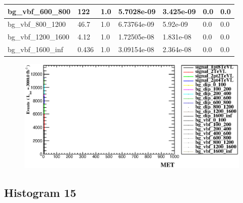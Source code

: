 \documentclass[a4paper, 10pt]{article}
\begin{document}
\begin{table}[H]
\begin{center}
\begin{tabular}{|m{23.0mm}|m{23.0mm}|m{18.0mm}|m{19.0mm}|m{19.0mm}|m{19.0mm}|m{19.0mm}|}
      \hline
      {\cellcolor{white}         bg\_vbf\_600\_800}& {\cellcolor{white}         122}& {\cellcolor{white}         1.0}& {\cellcolor{white}         5.7028e-09}& {\cellcolor{white}         3.425e-09}& {\cellcolor{green}         0.0}& {\cellcolor{green}         0.0}\\
      \hline
      {\cellcolor{white}         bg\_vbf\_800\_1200}& {\cellcolor{white}         46.7}& {\cellcolor{white}         1.0}& {\cellcolor{white}         6.73764e-09}& {\cellcolor{white}         5.92e-09}& {\cellcolor{green}         0.0}& {\cellcolor{green}         0.0}\\
      \hline
      {\cellcolor{white}         bg\_vbf\_1200\_1600}& {\cellcolor{white}         4.12}& {\cellcolor{white}         1.0}& {\cellcolor{white}         1.72505e-08}& {\cellcolor{white}         1.831e-08}& {\cellcolor{green}         0.0}& {\cellcolor{green}         0.0}\\
      \hline
      {\cellcolor{white}         bg\_vbf\_1600\_inf}& {\cellcolor{white}         0.436}& {\cellcolor{white}         1.0}& {\cellcolor{white}         3.09154e-08}& {\cellcolor{white}         2.364e-08}& {\cellcolor{green}         0.0}& {\cellcolor{green}         0.0}\\
\hline
    \end{tabular}
  \end{center}
\end{table}

\begin{figure}[H]
  \begin{center}
    \includegraphics[scale=0.45]{selection_13.eps}\\
\caption{   }
  \end{center}
\end{figure}
      \newpage
\subsection{ Histogram 15}
\end{document}
